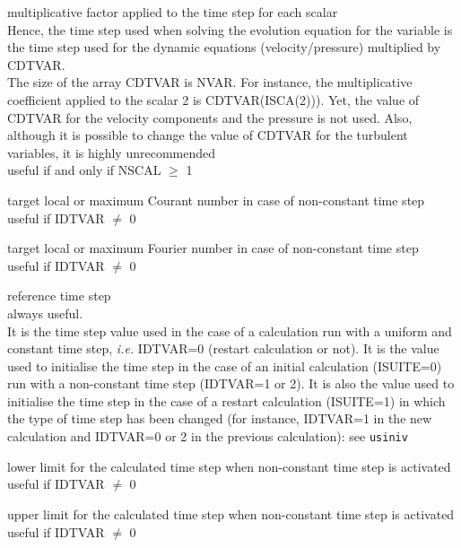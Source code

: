 {multiplicative factor applied to the time step for each scalar\\
Hence, the time step used when solving the evolution equation for the
variable is the time step used for the dynamic equations (velocity/pressure)
multiplied by CDTVAR.\\
The size of the array CDTVAR is NVAR. For instance, the multiplicative
coefficient applied to the scalar 2 is CDTVAR(ISCA(2))). Yet, the value of CDTVAR
for the velocity components and the pressure is not used. Also, although it is
possible to change the value of CDTVAR for the turbulent variables, it is
highly unrecommended\\
useful if and only if NSCAL $\geqslant$ 1}


{target local or maximum Courant number in case of non-constant time step\\
useful if IDTVAR $\ne$ 0}

{target local or maximum Fourier number in case of non-constant time step\\
useful if IDTVAR $\ne$ 0}

{reference time step \\
always useful.\\
It is the time step value used in the case of a calculation run with a
uniform and constant time step, {\em i.e.} IDTVAR=0 (restart calculation
or not). It is the value used to initialise the time step in the case of
an initial calculation (ISUITE=0) run with a non-constant time step
(IDTVAR=1 or 2). It is also the value used to initialise the time step
in the case of a restart calculation (ISUITE=1) in which the type of
time step has been changed (for instance, IDTVAR=1 in the new
calculation and IDTVAR=0 or 2 in the previous calculation): see
\texttt{usiniv}}

{lower limit for the calculated time step when non-constant time step is activated\\
useful if IDTVAR $\ne$ 0}

{upper limit for the calculated time step when non-constant time step is activated\\
useful if IDTVAR $\ne$ 0}

